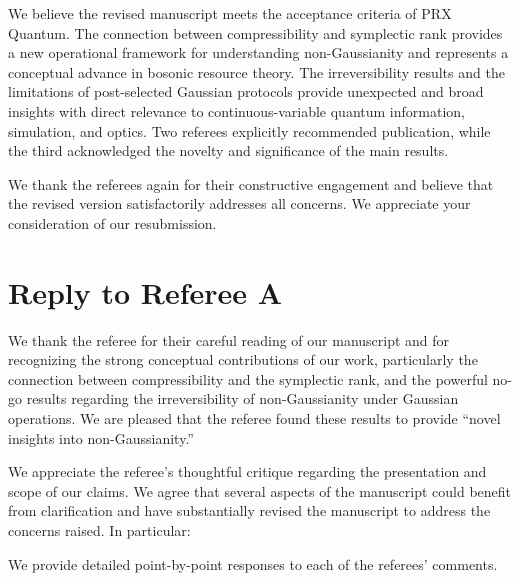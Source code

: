 \documentclass[a4paper,12pt]{article}
\begin{document}
\medskip

We believe the revised manuscript meets the acceptance criteria of PRX Quantum. The connection between compressibility and symplectic rank provides a new operational framework for understanding non-Gaussianity and represents a conceptual advance in bosonic resource theory. The irreversibility results and the limitations of post-selected Gaussian protocols provide unexpected and broad insights with direct relevance to continuous-variable quantum information, simulation, and optics. Two referees explicitly recommended publication, while the third acknowledged the novelty and significance of the main results.

\medskip

We thank the referees again for their constructive engagement and believe that the revised version satisfactorily addresses all concerns. We appreciate your consideration of our resubmission.



\section{Reply to Referee A}

We thank the referee for their careful reading of our manuscript and for recognizing the strong conceptual contributions of our work, particularly the connection between compressibility and the symplectic rank, and the powerful no-go results regarding the irreversibility of non-Gaussianity under Gaussian operations. We are pleased that the referee found these results to provide ``novel insights into non-Gaussianity.''

We appreciate the referee's thoughtful critique regarding the presentation and scope of our claims. We agree that several aspects of the manuscript could benefit from clarification and have substantially revised the manuscript to address the concerns raised. In particular:


We provide detailed point-by-point responses to each of the referees' comments. 
\newline



\iffalse
\newline
\end{document}
